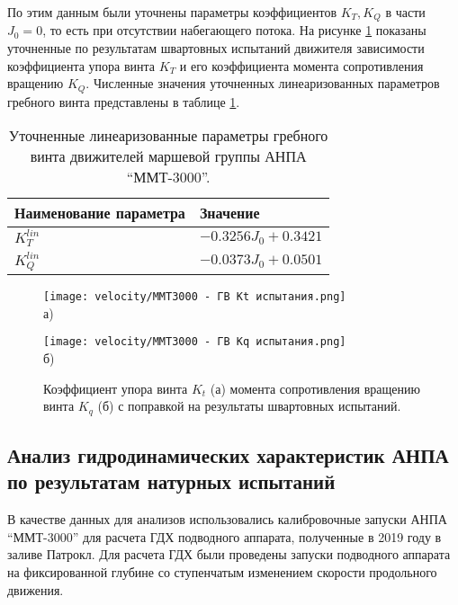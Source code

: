 По этим данным были уточнены параметры коэффициентов $K_T, K_Q$ в части $J_0 = 0$, то есть при отсутствии набегающего потока.
На рисунке \ref{fig:mmt3000_propeller_kt_kq_bollard} показаны уточненные по результатам швартовных испытаний движителя зависимости коэффициента упора винта $K_T$ и его коэффициента момента сопротивления вращению $K_Q$.
Численные значения уточненных линеаризованных параметров гребного винта представлены в таблице \ref{tab:mmt3000_propeller_bollard}.

\begin{table}
    \caption{Уточненные линеаризованные параметры гребного винта движителей маршевой группы АНПА ``ММТ-3000''.}
    \label{tab:mmt3000_propeller_bollard}
    \centering
    \begin{tabular}{ll}
        \toprule
        Наименование параметра  & Значение\\
        \midrule
        $K_T^{lin}$ & $-0.3256J_0 + 0.3421$ \\
        $K_Q^{lin}$ & $-0.0373J_0 + 0.0501$ \\
        \bottomrule
    \end{tabular}
\end{table}

\begin{figure}[ht]
    \begin{minipage}[b][][b]{0.49\linewidth}\centering
        \texttt{[image: velocity/MMT3000 - ГВ Kt испытания.png]}\\ а)
    \end{minipage}
    \hfill
    \begin{minipage}[b][][b]{0.49\linewidth}\centering
        \texttt{[image: velocity/MMT3000 - ГВ Kq испытания.png]} \\ б) 
    \end{minipage}
    \caption{Коэффициент упора винта $K_t$ (а) момента сопротивления вращению винта $K_q$ (б) с поправкой на результаты швартовных испытаний.}
    \label{fig:mmt3000_propeller_kt_kq_bollard}
\end{figure}

\subsection{Анализ гидродинамических характеристик АНПА по результатам натурных испытаний}
В качестве данных для анализов использовались калибровочные запуски АНПА ``ММТ-3000'' для расчета ГДХ подводного аппарата, полученные в 2019 году в заливе Патрокл.
Для расчета ГДХ были проведены запуски подводного аппарата на фиксированной глубине со ступенчатым изменением скорости продольного движения.

